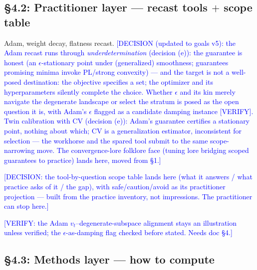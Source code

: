 \documentclass[11pt]{article}
\newcommand{\tagg}[1]{\textcolor{blue}{[#1]}}
\begin{document}
\subsection*{\S4.2: Practitioner layer --- recast tools $+$ scope table}

Adam, weight decay, flatness recast. \tagg{DECISION (updated to goals
v5): the Adam recast runs through \emph{underdetermination} (decision
(e)): the guarantee is honest (an $\epsilon$-stationary point under
(generalized) smoothness; guarantees promising minima invoke PL/strong
convexity) --- and the target is not a well-posed destination: the
objective specifies a set; the optimizer and its hyperparameters
silently complete the choice. Whether $\epsilon$ and its kin merely
navigate the degenerate landscape or select the stratum is posed as the
open question it is, with Adam's $\epsilon$ flagged as a candidate
damping instance [VERIFY]. Twin calibration with CV (decision (e)):
Adam's guarantee certifies a stationary point, nothing about which; CV
is a generalization estimator, inconsistent for selection --- the
workhorse and the spared tool submit to the same scope-narrowing move.
The convergence-lore folklore face (tuning lore bridging scoped
guarantees to practice) lands here, moved from \S1.}

\tagg{DECISION: the tool-by-question scope table lands here (what it
answers / what practice asks of it / the gap), with safe/caution/avoid
as its practitioner projection --- built from the practice inventory,
not impressions. The practitioner can stop here.}

\tagg{VERIFY: the Adam $v_t$--degenerate-subspace alignment stays an
illustration unless verified; the $\epsilon$-as-damping flag checked
before stated. Needs doc \S4.}

\subsection*{\S4.3: Methods layer --- how to compute}
\end{document}
